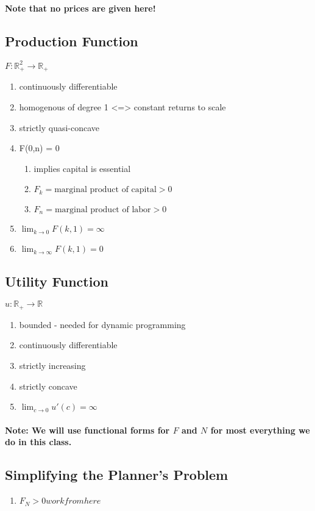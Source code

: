 \documentclass{article}
\begin{document}
\paragraph{Note that no prices are given here!}

\subsection{Production Function}
$F : \mathbb{R}^2_+ \rightarrow \mathbb{R}_+$
\begin{enumerate}
    \item continuously differentiable
    \item homogenous of degree 1 <=> constant returns to scale
    \item strictly quasi-concave
    \item F(0,n) = 0
    \begin {enumerate}
        \item implies capital is essential
        \item $F_k = \text{marginal product of capital} > 0$
        \item $F_n = \text{marginal product of labor} > 0$
    \end{enumerate}
    \item $\lim_{k \to 0} F(k,1) = \infty$
    \item $\lim_{k \to \infty} F(k,1) = 0$
\end{enumerate}

\subsection{Utility Function}
$u : \mathbb{R}_+ \rightarrow \mathbb{R}$
\begin{enumerate}
    \item bounded - needed for dynamic programming
    \item continuously differentiable
    \item strictly increasing
    \item strictly concave
    \item $\lim_{c \to 0} u'(c) = \infty$
\end{enumerate}

\paragraph{Note: We will use functional forms for $F$ and $N$ for most everything we do in this class.}

\subsection{Simplifying the Planner's Problem}
\begin{enumerate}
    \item $F_N > 0 work from here$
\end{enumerate}
\end{document}
